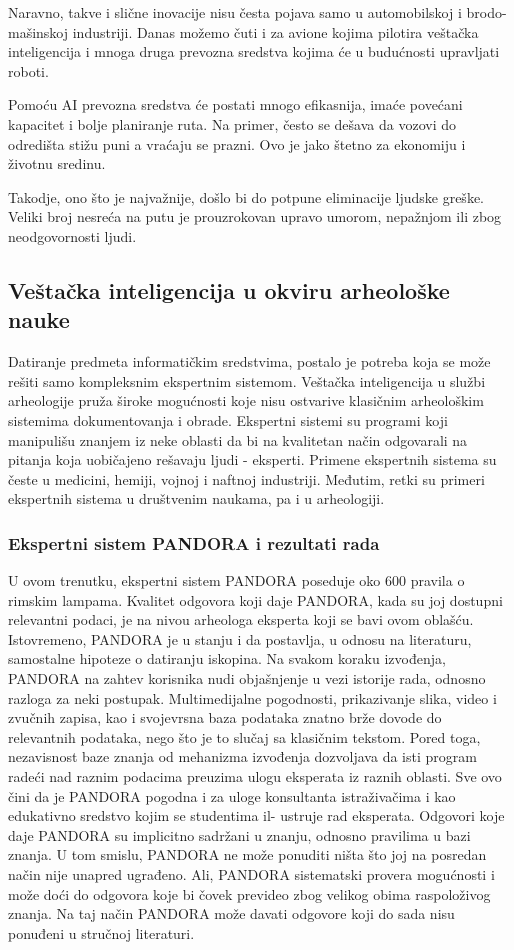 \documentclass[a4paper]{article}
\begin{document}
Naravno, takve i slične inovacije nisu česta pojava samo u automobilskoj i brodo-mašinskoj industriji. Danas možemo čuti i za avione kojima pilotira veštačka inteligencija i mnoga druga prevozna sredstva kojima će u budućnosti upravljati roboti.

Pomoću AI prevozna sredstva će postati mnogo efikasnija, imaće povećani kapacitet i bolje planiranje ruta. Na primer, često se dešava da vozovi do odredišta stižu puni a vraćaju se prazni. Ovo je jako štetno za ekonomiju i životnu sredinu. 

Takodje, ono što je najvažnije, došlo bi do potpune eliminacije ljudske greške. Veliki broj nesreća na putu je prouzrokovan upravo umorom, nepažnjom ili zbog neodgovornosti ljudi. 

\subsection{Veštačka inteligencija u okviru arheološke nauke}

Datiranje predmeta informatičkim sredstvima, postalo je potreba koja se može rešiti samo kompleksnim ekspertnim sistemom. Veštačka inteligencija u službi arheologije pruža široke mogućnosti koje nisu ostvarive klasičnim arheološkim sistemima dokumentovanja i obrade.
Ekspertni sistemi su programi koji manipulišu znanjem iz neke oblasti da bi na kvalitetan način odgovarali na pitanja koja uobičajeno rešavaju ljudi - eksperti. Primene ekspertnih sistema su česte u medicini, hemiji, vojnoj i naftnoj industriji. Međutim, retki su primeri ekspertnih sistema u društvenim naukama, pa i u arheologiji.


\subsubsection{Ekspertni sistem PANDORA i rezultati rada}


U ovom trenutku, ekspertni sistem PANDORA poseduje oko 600 pravila o rimskim lampama. Kvalitet odgovora koji daje PANDORA, kada su joj dostupni relevantni podaci, je na nivou arheologa eksperta koji se bavi ovom oblašću. Istovremeno, PANDORA je u stanju i da postavlja,
u odnosu na literaturu, samostalne hipoteze o datiranju iskopina. Na svakom koraku izvođenja, PANDORA na zahtev korisnika nudi objašnjenje u vezi istorije rada, odnosno razloga za neki postupak. Multimedijalne pogodnosti, prikazivanje slika, video i zvučnih zapisa, kao i svojevrsna baza podataka znatno brže dovode do relevantnih podataka, nego što je to slučaj sa klasičnim tekstom. Pored toga, nezavisnost baze znanja od mehanizma izvođenja dozvoljava da isti program radeći
nad raznim podacima preuzima ulogu eksperata iz raznih oblasti. Sve ovo čini da je PANDORA
pogodna i za uloge konsultanta istraživačima i kao edukativno sredstvo kojim se studentima il-
ustruje rad eksperata. Odgovori koje daje PANDORA su implicitno sadržani u znanju, odnosno pravilima u bazi znanja. U tom smislu, PANDORA ne može ponuditi ništa
što joj na posredan način nije unapred ugrađeno. Ali, PANDORA sistematski provera mogućnosti
i može doći do odgovora koje bi čovek prevideo zbog velikog obima raspoloživog znanja. Na taj
način PANDORA može davati odgovore koji do sada nisu ponuđeni u stručnoj literaturi.
\end{document}
